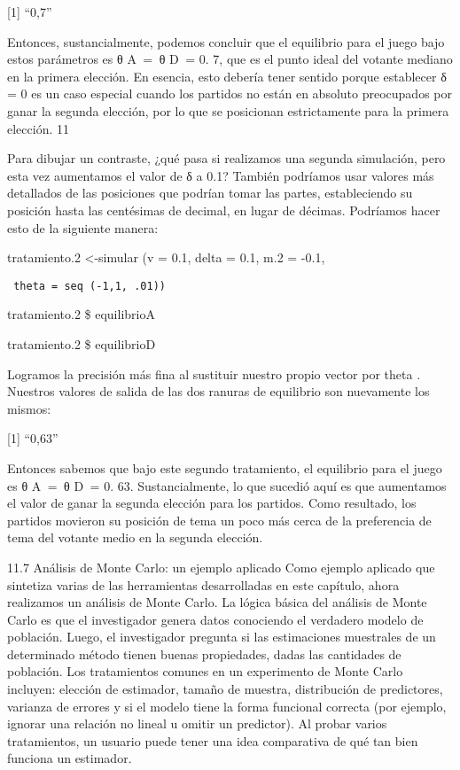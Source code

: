 \documentclass[
]{book}
\begin{document}
{[}1{]} ``0,7''

Entonces, sustancialmente, podemos concluir que el equilibrio para el juego bajo estos parámetros es θ A  =  θ D  = 0. 7, que es el punto ideal del votante mediano en la primera elección. En esencia, esto debería tener sentido porque establecer δ  = 0 es un caso especial cuando los partidos no están en absoluto preocupados por ganar la segunda elección, por lo que se posicionan estrictamente para la primera elección. 11

Para dibujar un contraste, ¿qué pasa si realizamos una segunda simulación, pero esta vez aumentamos el valor de δ a 0.1? También podríamos usar valores más detallados de las posiciones que podrían tomar las partes, estableciendo su posición hasta las centésimas de decimal, en lugar de décimas. Podríamos hacer esto de la siguiente manera:

tratamiento.2 \textless-simular (v = 0.1, delta = 0.1, m.2 = -0.1,

\begin{verbatim}
 theta = seq (-1,1, .01))
\end{verbatim}

tratamiento.2 \$ equilibrioA

tratamiento.2 \$ equilibrioD

Logramos la precisión más fina al sustituir nuestro propio vector por theta . Nuestros valores de salida de las dos ranuras de equilibrio son nuevamente los mismos:

{[}1{]} ``0,63''

Entonces sabemos que bajo este segundo tratamiento, el equilibrio para el juego es θ A  =  θ D  = 0. 63. Sustancialmente, lo que sucedió aquí es que aumentamos el valor de ganar la segunda elección para los partidos. Como resultado, los partidos movieron su posición de tema un poco más cerca de la preferencia de tema del votante medio en la segunda elección.

11.7 Análisis de Monte Carlo: un ejemplo aplicado
Como ejemplo aplicado que sintetiza varias de las herramientas desarrolladas en este capítulo, ahora realizamos un análisis de Monte Carlo. La lógica básica del análisis de Monte Carlo es que el investigador genera datos conociendo el verdadero modelo de población. Luego, el investigador pregunta si las estimaciones muestrales de un determinado método tienen buenas propiedades, dadas las cantidades de población. Los tratamientos comunes en un experimento de Monte Carlo incluyen: elección de estimador, tamaño de muestra, distribución de predictores, varianza de errores y si el modelo tiene la forma funcional correcta (por ejemplo, ignorar una relación no lineal u omitir un predictor). Al probar varios tratamientos, un usuario puede tener una idea comparativa de qué tan bien funciona un estimador.
\end{document}
